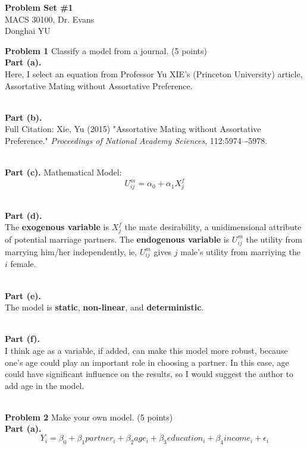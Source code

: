 \documentclass[letterpaper,12pt]{article}
\theoremstyle{definition}
\begin{document}
\begin{flushleft}
  \textbf{\large{Problem Set \#1}} \\
  MACS 30100, Dr. Evans \\
  Donghai YU
\end{flushleft}

\vspace{5mm}

\noindent\textbf{Problem 1} Classify a model from a journal. (5 points)
\noindent\\\textbf{Part (a).} 
\\Here, I select an equation from Professor Yu XIE's (Princeton University) article, Assortative Mating without Assortative Preference.

\noindent\\\textbf{Part (b).} 
\\Full Citation: Xie, Yu (2015) "Assortative Mating without Assortative Preference." \textit{Proceedings of National Academy Sciences}, 112:5974–-5978.

\noindent\\\textbf{Part (c).} Mathematical Model:
\begin{equation*}
  U_{ij}^{m} = \alpha_{0} + \alpha_{1}X_{j}^{f}
\end{equation*}

\noindent\\\textbf{Part (d).} 
\\The \textbf{exogenous variable} is $X_{j}^{f}$ the mate desirability, a unidimensional attribute of potential marriage partners. The \textbf{endogenous variable} is $U_{ij}^{m}$ the utility from marrying him/her independently, ie, $U_{ij}^{m}$ gives $j$ male's utility from marriying the $i$ female. 

\noindent\\\textbf{Part (e).} 
\\The model is \textbf{static}, \textbf{non-linear}, and \textbf{deterministic}. 

\noindent\\\textbf{Part (f).} 
\\I think age as a variable, if added, can make this model more robust, because one's age could play an important role in choosing a partner. In this case, age could have significant influence on the results, so I would suggest the author to add age in the model. 

\pagebreak
\noindent\\\textbf{Problem 2} Make your own model. (5 points)
\noindent\\\textbf{Part (a).} 
\begin{equation*}
  Y_{i} = \beta_{0} + \beta_{1}partner_{i} + \beta_{2}age_{i} + \beta_{3}education_{i} + \beta_{4}income_{i} + \epsilon_{i}
\end{equation*}
\end{document}

